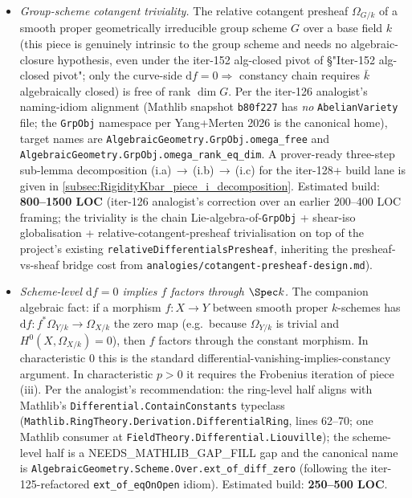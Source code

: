 \begin{itemize}
  \item[(i)] \emph{Group-scheme cotangent triviality.} The relative cotangent presheaf \(\Omega_{G/k}\) of a smooth proper geometrically irreducible group scheme \(G\) over a base field \(k\) (this piece is genuinely intrinsic to the group scheme and needs no algebraic-closure hypothesis, even under the iter-152 alg-closed pivot of \S "Iter-152 alg-closed pivot"; only the curve-side \(\mathrm df = 0 \Rightarrow\) constancy chain requires \(\bar k\) algebraically closed) is free of rank \(\dim G\). Per the iter-126 analogist's naming-idiom alignment (Mathlib snapshot \texttt{b80f227} has \emph{no} \texttt{AbelianVariety} file; the \texttt{GrpObj} namespace per Yang+Merten 2026 is the canonical home), target names are \texttt{AlgebraicGeometry.GrpObj.omega\_free} and \texttt{AlgebraicGeometry.GrpObj.omega\_rank\_eq\_dim}. A prover-ready three-step sub-lemma decomposition (i.a)\,\(\to\)\,(i.b)\,\(\to\)\,(i.c) for the iter-128+ build lane is given in \cref{subsec:RigidityKbar_piece_i_decomposition}. Estimated build: \textbf{800--1500 LOC} (iter-126 analogist's correction over an earlier 200--400 LOC framing; the triviality is the chain Lie-algebra-of-\texttt{GrpObj} + shear-iso globalisation + relative-cotangent-presheaf trivialisation on top of the project's existing \texttt{relativeDifferentialsPresheaf}, inheriting the presheaf-vs-sheaf bridge cost from \texttt{analogies/cotangent-presheaf-design.md}).

  \item[(ii)] \emph{Scheme-level \(\mathrm d f = 0\) implies \(f\) factors through \(\Spec k\).} The companion algebraic fact: if a morphism \(f \colon X \to Y\) between smooth proper \(k\)-schemes has \(\mathrm d f \colon f^* \Omega_{Y/k} \to \Omega_{X/k}\) the zero map (e.g.\ because \(\Omega_{Y/k}\) is trivial and \(H^0(X, \Omega_{X/k}) = 0\)), then \(f\) factors through the constant morphism. In characteristic \(0\) this is the standard differential-vanishing-implies-constancy argument. In characteristic \(p > 0\) it requires the Frobenius iteration of piece (iii). Per the analogist's recommendation: the ring-level half aligns with Mathlib's \texttt{Differential.ContainConstants} typeclass (\texttt{Mathlib.RingTheory.Derivation.DifferentialRing}, lines 62--70; one Mathlib consumer at \texttt{FieldTheory.Differential.Liouville}); the scheme-level half is a NEEDS\_MATHLIB\_GAP\_FILL gap and the canonical name is \texttt{AlgebraicGeometry.Scheme.Over.ext\_of\_diff\_zero} (following the iter-125-refactored \texttt{ext\_of\_eqOnOpen} idiom). Estimated build: \textbf{250--500 LOC}.


\end{itemize}
